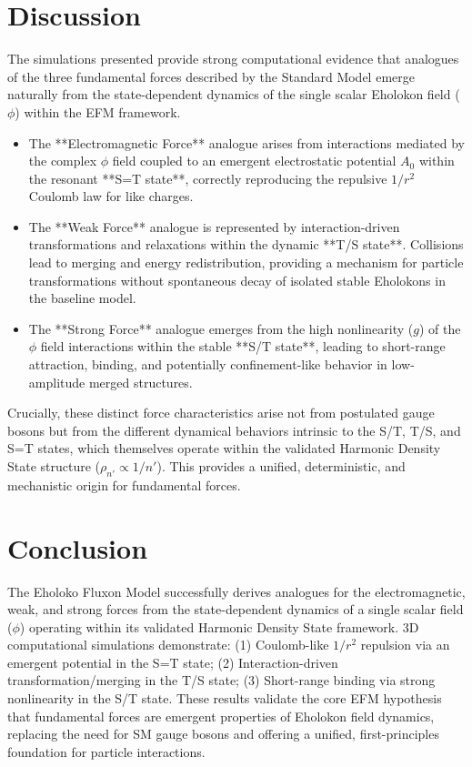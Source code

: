 \documentclass[11pt]{article}
\begin{document}
\section{Discussion}
The simulations presented provide strong computational evidence that analogues of the three fundamental forces described by the Standard Model emerge naturally from the state-dependent dynamics of the single scalar Eholokon field (\(\phi\)) within the EFM framework.
\begin{itemize}
    \item The **Electromagnetic Force** analogue arises from interactions mediated by the complex \(\phi\) field coupled to an emergent electrostatic potential \(A_0\) within the resonant **S=T state**, correctly reproducing the repulsive \(1/r^2\) Coulomb law for like charges.
    \item The **Weak Force** analogue is represented by interaction-driven transformations and relaxations within the dynamic **T/S state**. Collisions lead to merging and energy redistribution, providing a mechanism for particle transformations without spontaneous decay of isolated stable Eholokons in the baseline model.
    \item The **Strong Force** analogue emerges from the high nonlinearity (\(g\)) of the \(\phi\) field interactions within the stable **S/T state**, leading to short-range attraction, binding, and potentially confinement-like behavior in low-amplitude merged structures.
\end{itemize}
Crucially, these distinct force characteristics arise not from postulated gauge bosons but from the different dynamical behaviors intrinsic to the S/T, T/S, and S=T states, which themselves operate within the validated Harmonic Density State structure (\(\rho_{n'} \propto 1/n'\)). This provides a unified, deterministic, and mechanistic origin for fundamental forces.

\section{Conclusion}
The Eholoko Fluxon Model successfully derives analogues for the electromagnetic, weak, and strong forces from the state-dependent dynamics of a single scalar field (\(\phi\)) operating within its validated Harmonic Density State framework. 3D computational simulations demonstrate: (1) Coulomb-like \(1/r^2\) repulsion via an emergent potential in the S=T state; (2) Interaction-driven transformation/merging in the T/S state; (3) Short-range binding via strong nonlinearity in the S/T state. These results validate the core EFM hypothesis that fundamental forces are emergent properties of Eholokon field dynamics, replacing the need for SM gauge bosons and offering a unified, first-principles foundation for particle interactions.
\end{document}
